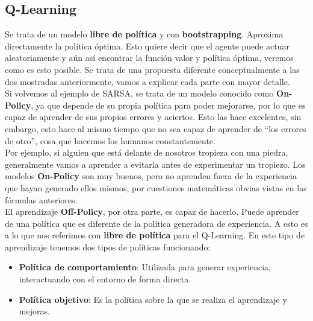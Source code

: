 \documentclass[11pt,fleqn]{book} %
\begin{document}
\subsection{Q-Learning}\label{sec:qlearning}

Se trata de un modelo \textbf{libre de política} y con \textbf{bootstrapping}. Aproxima directamente la política óptima. Esto quiere decir que el agente puede actuar aleatoriamente y aún así encontrar la función valor y política óptima, veremos como es esto posible. Se trata de una propuesta diferente conceptualmente a las dos mostradas anteriormente, vamos a explicar cada parte con mayor detalle. \\

Si volvemos al ejemplo de SARSA, se trata de un modelo conocido como \textbf{On-Policy}, ya que depende de su propia política para poder mejorarse, por lo que es capaz de aprender de sus propios errores y aciertos. Esto las hace excelentes, sin embargo, esto hace al mismo tiempo que no sea capaz de aprender de ``los errores de otro'', cosa que hacemos los humanos constantemente. \\

Por ejemplo, si alguien que está delante de nosotros tropieza con una piedra, generalmente vamos a aprender a evitarla antes de experimentar un tropiezo. Los modelos \textbf{On-Policy} son muy buenos, pero no aprenden fuera de la experiencia que hayan generado ellos mismos, por cuestiones matemáticas obvias vistas en las fórmulas anteriores. \\

El aprendizaje \textbf{Off-Policy}, por otra parte, es capaz de hacerlo. Puede aprender de una política que es diferente de la política generadora de experiencia. A esto es a lo que nos referimos con \textbf{libre de política} para el Q-Learning. En este tipo de aprendizaje tenemos dos tipos de políticas funcionando:\\

\begin{itemize}
	\item \textbf{Política de comportamiento}: Utilizada para generar experiencia, interactuando con el entorno de forma directa.\\
	
	\item \textbf{Política objetivo}: Es la política sobre la que se realiza el aprendizaje y mejoras.\\
\end{itemize}
\end{document}
